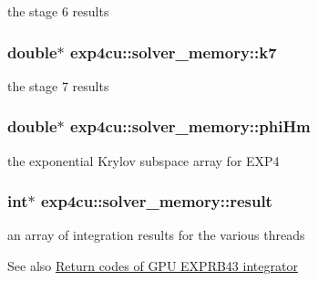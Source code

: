 the stage 6 results 

\subsubsection[{\texorpdfstring{k7}{k7}}]{\setlength{\rightskip}{0pt plus 5cm}double$\ast$ exp4cu\+::solver\+\_\+memory\+::k7}\hypertarget{structexp4cu_1_1solver__memory_aa2776a2d992080e4e4c3e557c26ba2f7}{}\label{structexp4cu_1_1solver__memory_aa2776a2d992080e4e4c3e557c26ba2f7}


the stage 7 results 

\subsubsection[{\texorpdfstring{phi\+Hm}{phiHm}}]{\setlength{\rightskip}{0pt plus 5cm}double$\ast$ exp4cu\+::solver\+\_\+memory\+::phi\+Hm}\hypertarget{structexp4cu_1_1solver__memory_a3278cfbb9029ad325ca304b995097c64}{}\label{structexp4cu_1_1solver__memory_a3278cfbb9029ad325ca304b995097c64}


the exponential Krylov subspace array for E\+X\+P4 

\subsubsection[{\texorpdfstring{result}{result}}]{\setlength{\rightskip}{0pt plus 5cm}int$\ast$ exp4cu\+::solver\+\_\+memory\+::result}\hypertarget{structexp4cu_1_1solver__memory_aa0f66d6db2a4db2d779ff4dc407821b5}{}\label{structexp4cu_1_1solver__memory_aa0f66d6db2a4db2d779ff4dc407821b5}


an array of integration results for the various threads 

\begin{DoxySeeAlso}{See also}
\hyperlink{group__exp4cu__ErrCodes}{Return codes of G\+P\+U E\+X\+P\+R\+B43 integrator} 
\end{DoxySeeAlso}
